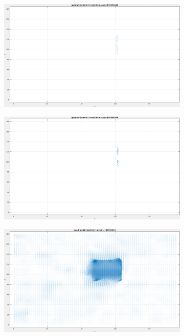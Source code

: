 \begin{appendix}
\begin{figure}[tb]
\begin{subfigure}{.45\textwidth}
  \includegraphics[height=.6\linewidth]{figs/quadrat/quadrat-masked-1.png}
  \caption{}
\end{subfigure}
\begin{subfigure}{.45\textwidth}
  \centering
  \includegraphics[height=.6\linewidth]{figs/quadrat/quadrat-masked-2.png}
  \caption{}
\end{subfigure}
\begin{subfigure}{.45\textwidth}
  \centering
  \includegraphics[height=.6\linewidth]{figs/quadrat/quadrat-GT-1.png}

\end{subfigure}
\end{figure}
\end{appendix}
